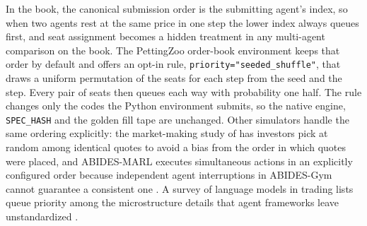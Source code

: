 In the book, the canonical submission order is the submitting agent's index, so when two agents rest at the same price in one step the lower index always queues first, and seat assignment becomes a hidden treatment in any multi-agent comparison on the book. The PettingZoo order-book environment keeps that order by default and offers an opt-in rule, \texttt{priority="seeded\_shuffle"}, that draws a uniform permutation of the seats for each step from the seed and the step. Every pair of seats then queues each way with probability one half. The rule changes only the codes the Python environment submits, so the native engine, \texttt{SPEC\_HASH} and the golden fill tape are unchanged. Other simulators handle the same ordering explicitly: the market-making study of \citet[PDF p.~52]{fernandezvicente2025market} has investors pick at random among identical quotes to avoid a bias from the order in which quotes were placed, and ABIDES-MARL executes simultaneous actions in an explicitly configured order because independent agent interruptions in ABIDES-Gym cannot guarantee a consistent one \citep[p.~4]{cheridito2025abidesmarl}. A survey of language models in trading lists queue priority among the microstructure details that agent frameworks leave unstandardized \citep[p.~12]{fu2025newquant}.

